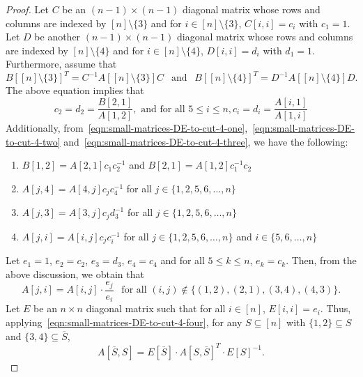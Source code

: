 \documentclass[11pt,letterpaper]{article}
\newcommand{\comp}[1]{\overline{#1}}
\newcommand{\nsubset}[1]{[n]\setminus\{#1\}}
\begin{document}
{{{\begin{proof}
Let $C$ be an $(n-1)\times (n-1)$ diagonal matrix whose rows and columns are indexed by $[n]\setminus\{3\}$ and for $i\in [n]\setminus\{3\}$, $C[i,i]=c_i$ with $c_1=1$. Let $D$ be another $(n-1)\times (n-1)$ diagonal matrix whose rows and columns are indexed by $[n]\setminus\{4\}$ and for $i\in [n]\setminus\{4\}$, $D[i,i]=d_i$ with $d_1=1$. Furthermore, assume that 
\begin{equation}
\label{eqn:small-matrices-DE-to-cut-4-two}
B[\nsubset{3}]^T=C^{-1}A[\nsubset{3}]C \ \ \text{ and }\ \ B[\nsubset{4}]^T=D^{-1}A[\nsubset{4}]D.
\end{equation}
The above equation implies that
\begin{equation}
\label{eqn:small-matrices-DE-to-cut-4-three}
c_2=d_2 = \frac{B[2,1]}{A[1,2]}, \text{ and for all } 5\leq i\leq n, c_i=d_i =\frac{A[i,1]}{A[1,i]} 
\end{equation}
Additionally, from~\cref{eqn:small-matrices-DE-to-cut-4-one},~\cref{eqn:small-matrices-DE-to-cut-4-two} and~\cref{eqn:small-matrices-DE-to-cut-4-three}, we have the following:
\begin{enumerate}
\item $B[1,2]=A[2,1]c_1c_2^{-1}$ and $B[2,1]=A[1,2]c_1^{-1}c_2$
\item $A[j,4]=A[4,j]c_jc_4^{-1}$ for all $j\in\{1,2,5,6,\ldots, n\}$ 
\item $A[j,3]=A[3,j]c_jd_3^{-1}$ for all $j\in\{1,2,5,6,\ldots, n\}$
\item $A[j,i]=A[i,j]c_jc_i^{-1}$ for all $j\in\{1,2,5,6,\ldots, n\}$ and $i\in\{5,6,\ldots, n\}$
\end{enumerate}
Let $e_1=1$, $e_2=c_2$, $e_3=d_3$, $e_4=c_4$ and for all $5\leq k \leq n$, $e_k=c_k$. Then, from the above discussion, we obtain that 
\begin{equation}
\label{eqn:small-matrices-DE-to-cut-4-four}
A[j,i] =A[i,j]\cdot \frac{e_j}{e_i}\ \  \text{ for all } (i,j)\notin\{(1,2), (2,1), (3,4), (4,3)\}.
\end{equation}
Let $E$ be an $n\times n$ diagonal matrix such that for all $i\in[n]$, $E[i,i]=e_i$. Thus, applying~\cref{eqn:small-matrices-DE-to-cut-4-four}, for any $S\subseteq [n]$ with $\{1,2\}\subseteq S$ and $\{3,4\}\subseteq \comp{S}$, 
\begin{equation}
\label{eqn:small-matrices-DE-to-cut-4-five}
A[\comp{S}, S]=E[\comp{S}]\cdot A[S, \comp{S}]^T\cdot E[S]^{-1}.
\end{equation}





\end{proof}}}}
\end{document}
